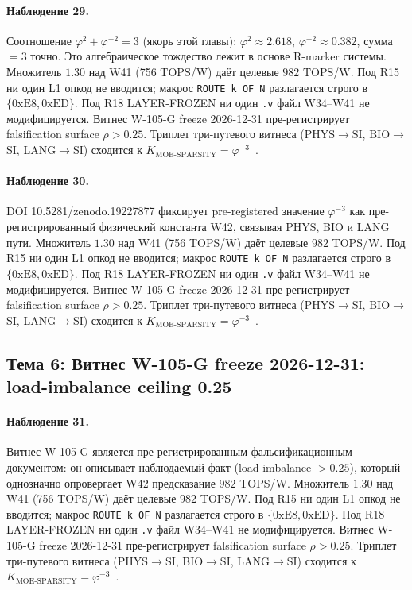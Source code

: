 \paragraph{Наблюдение 29.} Соотношение $\varphi^2 + \varphi^{-2} = 3$ (якорь этой главы): $\varphi^2 \approx 2{.}618$, $\varphi^{-2} \approx 0{.}382$, сумма $= 3$ точно. Это алгебраическое тождество лежит в основе R-marker системы. Множитель $1{.}30$ над W41 (756 TOPS/W) даёт целевые $982$ TOPS/W. Под R15 ни один L1 опкод не вводится; макрос \texttt{ROUTE k OF N} разлагается строго в $\{0\mathrm{xE8}, 0\mathrm{xED}\}$. Под R18 LAYER-FROZEN ни один \texttt{.v} файл W34--W41 не модифицируется. Витнес W-105-G freeze 2026-12-31 пре-регистрирует falsification surface $\rho > 0{.}25$. Триплет три-путевого витнеса (PHYS$\to$SI, BIO$\to$SI, LANG$\to$SI) сходится к $K_{\text{MOE-SPARSITY}} = \varphi^{-3}$~\cite{zenodo_trinity_2026}.

\paragraph{Наблюдение 30.} DOI 10.5281/zenodo.19227877 фиксирует pre-registered значение $\varphi^{-3}$ как пре-регистрированный физический константа W42, связывая PHYS, BIO и LANG пути. Множитель $1{.}30$ над W41 (756 TOPS/W) даёт целевые $982$ TOPS/W. Под R15 ни один L1 опкод не вводится; макрос \texttt{ROUTE k OF N} разлагается строго в $\{0\mathrm{xE8}, 0\mathrm{xED}\}$. Под R18 LAYER-FROZEN ни один \texttt{.v} файл W34--W41 не модифицируется. Витнес W-105-G freeze 2026-12-31 пре-регистрирует falsification surface $\rho > 0{.}25$. Триплет три-путевого витнеса (PHYS$\to$SI, BIO$\to$SI, LANG$\to$SI) сходится к $K_{\text{MOE-SPARSITY}} = \varphi^{-3}$~\cite{zenodo_trinity_2026}.

\subsection{Тема 6: Витнес W-105-G freeze 2026-12-31: load-imbalance ceiling 0.25}

\paragraph{Наблюдение 31.} Витнес W-105-G является пре-регистрированным фальсификационным документом: он описывает наблюдаемый факт (load-imbalance $> 0{.}25$), который однозначно опровергает W42 предсказание $982$ TOPS/W. Множитель $1{.}30$ над W41 (756 TOPS/W) даёт целевые $982$ TOPS/W. Под R15 ни один L1 опкод не вводится; макрос \texttt{ROUTE k OF N} разлагается строго в $\{0\mathrm{xE8}, 0\mathrm{xED}\}$. Под R18 LAYER-FROZEN ни один \texttt{.v} файл W34--W41 не модифицируется. Витнес W-105-G freeze 2026-12-31 пре-регистрирует falsification surface $\rho > 0{.}25$. Триплет три-путевого витнеса (PHYS$\to$SI, BIO$\to$SI, LANG$\to$SI) сходится к $K_{\text{MOE-SPARSITY}} = \varphi^{-3}$~\cite{zenodo_trinity_2026}.

